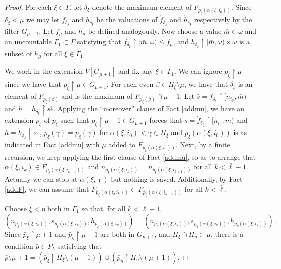 \documentclass{amsart}
\theoremstyle{definition}
\theoremstyle{remark}
\begin{document}
\begin{proof}
For each $\xi\in\Gamma$, let $\delta_\xi$ denote the maximum
element of $F_{p_\xi(\alpha(\xi,i_0))}$.  Since $\delta_\xi<\mu$
we may  
let $f_{\delta_\xi}$ and $h_{\delta_\xi}$ be the valuations
of $\dot f_{\delta_\xi}$ and  $\dot h_{\delta_\xi}$ respectively
by the filter $G_{\mu+1}$. Let
 $f_\mu$ and $h_\mu$ be defined analogously.
Now choose a value $\bar m\in\omega$ and an uncountable
 $\Gamma_1\subset \Gamma$ satisfying that
  $f_{\delta_\xi} \restriction [\bar m,\omega)\leq f_\mu$,
  and 
   $h_{\delta_\xi}\restriction [\bar m,\omega)\times\omega$
   is a subset of $h_\mu$ for all $\xi\in \Gamma_1$.

We work in the extension $V[G_{\mu+1}]$ and fix any $\xi\in \Gamma_1$.
We can ignore $p_\xi\restriction \mu$ since we have
that $p_\xi\restriction \mu\in G_{\mu+1}$.  
 For each even $\beta\in H_\xi\setminus \mu$, 
 we have that  $\delta_\xi$ is an
 element of $F_{p_\xi(\beta)}$ and is
 the maximum of $F_{p_\xi(\beta)}\cap \mu+1$.
 Let $\bar s = f_{\delta_\xi}\restriction [n_{i_0} , \bar m)$
 and $\bar h = h_{\delta_\xi}\restriction \bar s^\downarrow$. 
Applying the ``moreover'' clause of Fact \ref{addmu}, we have an extension
 $\bar p_\xi$ of $p_\xi$ such
 that $\bar p_\xi \restriction \mu{+}1\in G_{\mu+1}$ forces
 that
 $\bar s = \dot f_{\delta_\xi}\restriction [n_{i_0} , \bar m)$
 and $\bar h = \dot h_{\delta_\xi}\restriction \bar s^\downarrow$,
 $\bar p_\xi(\gamma) = p_\xi(\gamma)$ for $\alpha(\xi,i_0)< \gamma \in H_\xi$
 and
  $\bar p_\xi(\alpha(\xi,i_0))$ is as indicated in Fact \ref{addmu}
  with $\mu$ added to $ F_{\bar p_\xi(\alpha(\xi,i_0))}$.
  Next, by a finite recursion, we keep applying the first
  clause of Fact \ref{addmu}, so as to arrange that
    $\alpha(\xi,i_k)\in F_{\bar p_\xi(\alpha(\xi,i_{k+1}))}$
    and
     $n_{\bar p_\xi(\alpha(\xi,i_k))}=n_{\bar p_\xi(\alpha(\xi,i_{k+1}))}$
     for all
     $  k<\bar \ell-1$.  
     Actually we can stop at
      $\alpha(\xi,\bar\imath ) $ but nothing is saved.
      Additionally, by Fact \ref{addF}, we can assume
      that $F_{\bar p_\xi(\alpha(\xi,i_k))} \subset
         F_{\bar p_\xi(\alpha(\xi,i_{k+1}))}$ for all $k<\bar\ell$.

 Choose $\xi <\eta$ both in $\Gamma_1$
 so that, for all $k < \bar \ell-1$,
  $$( n_{\bar p_\xi(\alpha(\xi,i_k))} , 
 s_{\bar p_\xi(\alpha(\xi,i_k))} , 
  h_{\bar p_\xi(\alpha(\xi,i_k))})
  =( n_{\bar p_\eta(\alpha(\xi,i_k))} , 
 s_{\bar p_\eta(\alpha(\xi,i_k))} , 
  h_{\bar p_\eta(\alpha(\xi,i_k))})
  ~.$$
 Since $\bar p_\xi \restriction \mu+1$ and
 $\bar p_\eta\restriction \mu+1$ are both in $G_{\mu+1}$,
 and $H_\xi\cap H_\eta\subset \mu$, there is a condition
  $\bar p\in P_\lambda$ satisfying that
   $\bar p\setminus \mu+1 = (\bar p_\xi \restriction H_\xi\setminus(\mu+1))
   \cup (\bar p_\eta \restriction H_\eta \setminus (\mu+1))$.
 

\end{proof}
\end{document}
